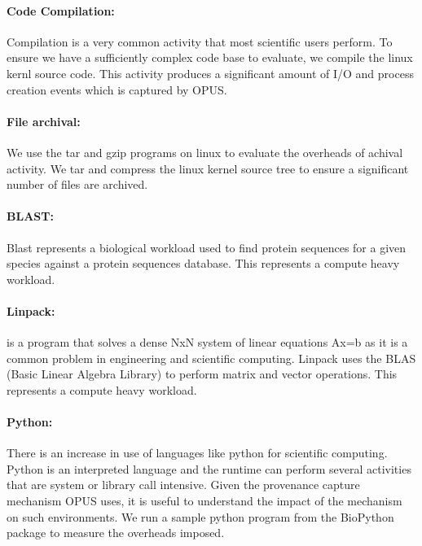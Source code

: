 \documentclass[withindex,glossary]{cam-thesis}
\begin{document}
\paragraph{Code Compilation:} Compilation is a very common activity that most scientific users perform.
To ensure we have a sufficiently complex code base to evaluate, we compile the linux kernl source code.
This activity produces a significant amount of I/O and process creation events which is captured by OPUS. 

\paragraph{File archival:} We use the tar and gzip programs on linux to evaluate the overheads of achival activity.
We tar and compress the linux kernel source tree to ensure a significant number of files are archived.

\paragraph{BLAST:} Blast represents a biological workload used to find protein sequences for a given species against a protein sequences database.
This represents a compute heavy workload.

\paragraph{Linpack:} is a program that solves a dense NxN system of linear equations Ax=b as it is a common problem in engineering and scientific computing.
Linpack uses the BLAS (Basic Linear Algebra Library) to perform matrix and vector operations.
This represents a compute heavy workload.

\paragraph{Python:} There is an increase in use of languages like python for scientific computing.
Python is an interpreted language and the runtime can perform several activities that are system or library call intensive.
Given the provenance capture mechanism OPUS uses, it is useful to understand the impact of the mechanism on such environments.
We run a sample python program from the BioPython package to measure the overheads imposed.

\end{document}
